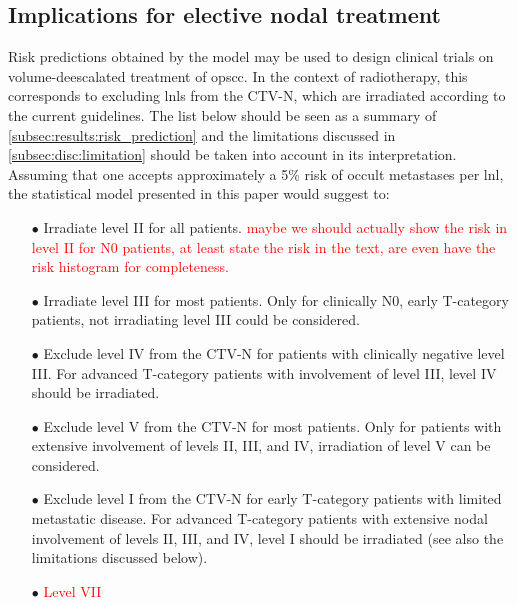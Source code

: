 \documentclass[twocolumn]{aastex631}
\newcommand{\ju}[1]{{\textcolor{red}{#1}}}
\begin{document}
\subsection{Implications for elective nodal treatment} 
Risk predictions obtained by the model may be used to design clinical trials on volume-deescalated treatment of \gls{opscc}. In the context of radiotherapy, this corresponds to excluding \glspl{lnl} from the CTV-N, which are irradiated according to the current guidelines. The list below should be seen as a summary of \cref{subsec:results:risk_prediction} and the limitations discussed in \cref{subsec:disc:limitation} should be taken into account in its interpretation. Assuming that one accepts approximately a 5\% risk of occult metastases per \gls{lnl}, the statistical model presented in this paper would suggest to:
\begin{itemize}
    \item[$\bullet$] Irradiate level II for all patients. \ju{maybe we should actually show the risk in level II for N0 patients, at least state the risk in the text, are even have the risk histogram for completeness.}
    \item[$\bullet$] Irradiate level III for most patients. Only for clinically N0, early T-category patients, not irradiating level III could be considered. 
    \item[$\bullet$] Exclude level IV from the CTV-N for patients with clinically negative level III. For advanced T-category patients with involvement of level III, level IV should be irradiated. %
    \item[$\bullet$] Exclude level V from the CTV-N for most patients. Only for patients with extensive involvement of levels II, III, and IV, irradiation of level V can be considered.
    \item[$\bullet$] Exclude level I from the CTV-N for early T-category patients with limited metastatic disease. For advanced T-category patients with extensive nodal involvement of levels II, III, and IV, level I should be irradiated (see also the limitations discussed below).
    \item[$\bullet$] \ju{Level VII}
\end{itemize}
\end{document}
